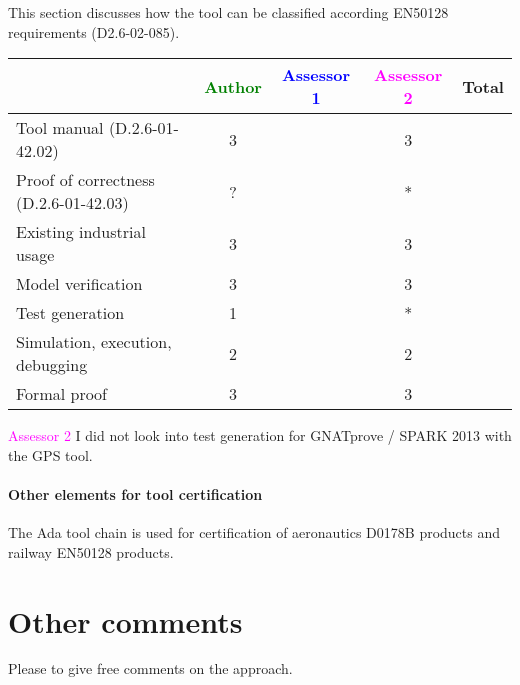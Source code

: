 This section discusses how the tool can be classified according EN50128 requirements (D2.6-02-085).


\begin{tabular}{|l | c | c | c | c|}
\hline
& \textcolor{green}{Author} & \textcolor{blue}{Assessor 1} & \textcolor{magenta}{Assessor 2} & Total \\
\hline 
Tool manual (D.2.6-01-42.02) & 3 & & 3 &  \\
\hline
Proof of correctness (D.2.6-01-42.03)   & ? & & * & \\
\hline
Existing industrial  usage  & 3 &  & 3 & \\
\hline
Model verification & 3 & & 3 & \\
\hline
Test generation & 1 & & * & \\
\hline
Simulation, execution, debugging & 2 & & 2 & \\
\hline
Formal proof & 3 & & 3 & \\
\hline
\end{tabular}

\textcolor{magenta}{Assessor 2} I did not look into test generation for
GNATprove / SPARK 2013 with the GPS tool.

\paragraph{Other elements for tool certification}


The Ada tool chain is used for certification of aeronautics D0178B
products and railway EN50128 products.

\section{Other comments}
Please to  give free comments on the approach.



